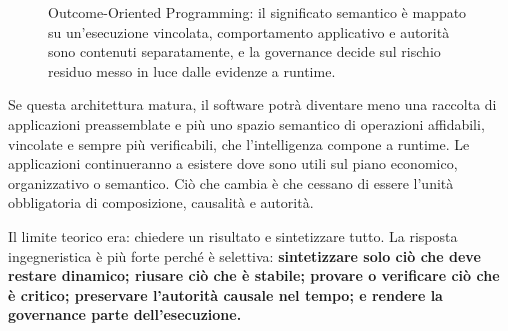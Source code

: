\documentclass[10pt,oneside,openany]{book}
\begin{document}
\begin{figure}[H]
\centering
{}
\caption{Outcome-Oriented Programming: il significato semantico è mappato su un'esecuzione vincolata, comportamento applicativo e autorità sono contenuti separatamente, e la governance decide sul rischio residuo messo in luce dalle evidenze a runtime.}
\end{figure}

Se questa architettura matura, il software potrà diventare meno una raccolta di applicazioni preassemblate e più uno spazio semantico di operazioni affidabili, vincolate e sempre più verificabili, che l'intelligenza compone a runtime. Le applicazioni continueranno a esistere dove sono utili sul piano economico, organizzativo o semantico. Ciò che cambia è che cessano di essere l'unità obbligatoria di composizione, causalità e autorità.

Il limite teorico era: chiedere un risultato e sintetizzare tutto. La risposta ingegneristica è più forte perché è selettiva: \textbf{sintetizzare solo ciò che deve restare dinamico; riusare ciò che è stabile; provare o verificare ciò che è critico; preservare l'autorità causale nel tempo; e rendere la governance parte dell'esecuzione.}
\end{document}
